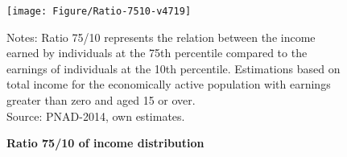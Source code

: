 \documentclass[a4paper, 12pt]{article}
\begin{document}
\vspace{60pt}

\begin{figure}[H]
   \centering
   \texttt{[image: Figure/Ratio-7510-v4719]}
   \label{fig:Ratio5010a}
   \begin{minipage}{0.77\textwidth} %
{\scriptsize
Notes: Ratio 75/10 represents the relation between the income earned by individuals at the 75th percentile compared to the earnings of individuals at the 10th percentile. Estimations based on total income for the economically active population with earnings greater than zero and aged 15 or over. \\
Source: PNAD-2014, own estimates.\par}
\end{minipage}
   \captionsetup{justification=centering,margin=2cm}
   \caption{\textbf{Ratio 75/10 of income distribution}}
 \end{figure}
\end{document}
